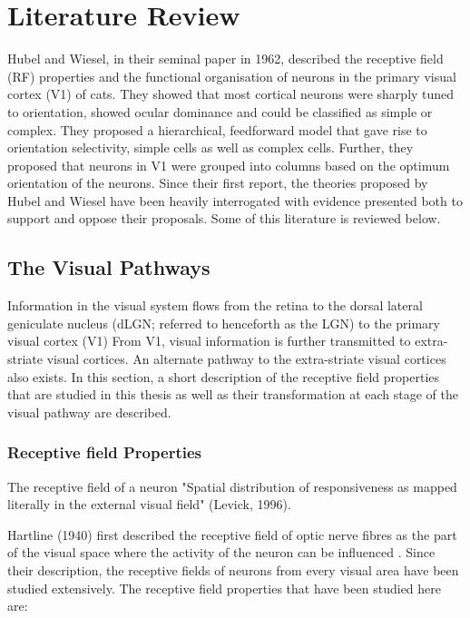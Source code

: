 \chapter{Literature Review}

Hubel and Wiesel, in their seminal paper in 1962, described the receptive field (RF) properties and the functional organisation of neurons in the primary visual cortex (V1) of cats. They showed that most cortical neurons were sharply tuned to orientation, showed ocular dominance and could be classified as simple or complex. They proposed a hierarchical, feedforward model that gave rise to orientation selectivity, simple cells as well as complex cells. Further, they proposed that neurons in V1 were grouped into columns based on the optimum orientation of the neurons. Since their first report, the theories proposed by Hubel and Wiesel have been heavily interrogated with evidence presented both to support and oppose their proposals. Some of this literature is reviewed below.

\section{The Visual Pathways}

Information in the visual system flows from the retina to the dorsal lateral geniculate nucleus (dLGN; referred to henceforth as the LGN) to the primary visual cortex (V1) From V1, visual information is further transmitted to extra-striate visual cortices. An alternate pathway to the extra-striate visual cortices also exists. In this section, a short description of the receptive field properties that are studied in this thesis as well as their transformation at each stage of the visual pathway are described.


\subsection{Receptive field Properties}
The receptive field of a neuron "Spatial distribution of responsiveness as mapped literally in the external visual field" (Levick, 1996). 


Hartline (1940) first described the receptive field of optic nerve fibres as the part of the visual space where the activity of the neuron can be influenced \cite{Hartline1940a}. Since their description, the receptive fields of neurons from every visual area have been studied extensively. The receptive field properties that have been studied here are:

